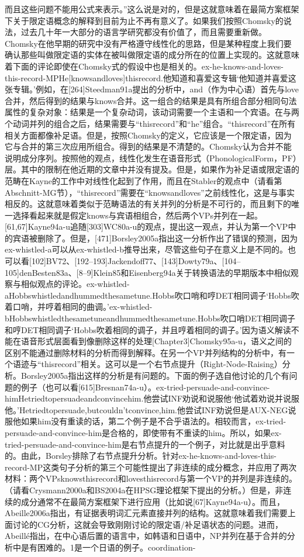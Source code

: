 而且这些问题不能用公式来表示。”这么说是对的，但是这就意味着在最简方案框架下关于限定语概念的解释到目前为止不再有意义了。如果我们按照Chomsky的说法，过去几十年一大部分的语言学研究都没有价值了，而且需要重新做。Chomsky在他早期的研究中没有严格遵守线性化的思路，但是某种程度上我们要确认那些叫做限定语的实体在被叫做限定语的成分所在的位置上实现的。这就意味着下面的评论即使在Chomsky式的假设中也是相关的。ex-he-knows-and-loves-this-record-MPHe[knowsandloves]thisrecord.他知道和喜爱这专辑`他知道并喜爱这张专辑。'例如，在[264]Steedman91a提出的分析中，and（作为中心语）首先与love合并，然后得到的结果与knows合并。这一组合的结果是具有所组合部分相同句法属性的复杂对象：结果是一个复杂动词，该动词需要一个主语和一个宾语。在与两个动词并列的组合之后，结果需要与“thisrecord”和“he”组合。“thisrecord”在所有相关方面都像补足语。但是，按照Chomsky的定义，它应该是一个限定语，因为它与合并的第三次应用所组合。得到的结果是不清楚的。Chomsky认为合并不能说明成分序列。按照他的观点，线性化发生在语音形式（PhonologicalForm，PF）层。其中的限制在他近期的文章中并没有提及。但是，如果作为补足语或限定语的范畴在Kayne的工作中对线性化起到了作用，而且在Stabler的观点中（请看第Abschnitt-MG节），“thisrecord”需要在“knowsandloves”之前线性化，这是与事实相反的。这就意味着类似于范畴语法的有关并列的分析是不可行的，而且剩下的唯一选择看起来就是假定knows与宾语相组合，然后两个VPs并列在一起。[61,67]Kayne94a-u追随[303]WC80a-u的观点，提出这一观点，并认为第一个VP中的宾语被删除了。但是，[471]Borsley2005a指出这一分析作出了错误的预测，因为ex-whistled-a可以从ex-whistled-b推导出来，尽管这些句子在意义上是不同的。也可以看[102]BV72、[192--193]Jackendoff77、[143]Dowty79a、[104--105]denBesten83a、[8--9]Klein85和Eisenberg94a关于转换语法的早期版本中相似观察与相似观点的评论。ex-whistled-aHobbswhistledandhummedthesametune.Hobbs吹口哨和哼DET相同调子`Hobbs吹着口哨，并哼着相同的曲调。'ex-whistled-bHobbswhistledthesametuneandhummedthesametune.Hobbs吹口哨DET相同调子和哼DET相同调子`Hobbs吹着相同的调子，并且哼着相同的调子。'因为语义解读不能在语音形式层面看到像删除这样的处理[Chapter3]Chomsky95a-u，语义之间的区别不能通过删除材料的分析而得到解释。在另一个VP并列结构的分析中，有一个语迹与“thisrecord”相关。这可以是一个右节点提升（Right-Node-Raising）分析。Borsley2005a指出这样的分析是有问题的。下面的例子选自他讨论的几个有问题的例子（也可以看[615]Bresnan74a-u）。ex-tried-persuade-and-convince-himHetriedtopersuadeandconvincehim.他尝试INF劝说和说服他`他试着劝说并说服他。'Hetriedtopersuade,butcouldn'tconvince,him.他尝试INF劝说但是AUX-NEG说服他如果him没有重读的话，第二个例子是不合乎语法的。相较而言，ex-tried-persuade-and-convince-him是合格的，即使带有不重读的him。所以，如果ex-tried-persuade-and-convince-him是右节点提升的一个例子，对比就是出乎意料的。由此，Borsley排除了右节点提升分析。针对ex-he-knows-and-loves-this-record-MP这类句子分析的第三个可能性提出了非连续的成分概念，并应用了两次材料：两个VPsknowsthisrecord和lovesthisrecord与第一个VP的并列是非连续的。（请看Crysmann2000a和BS2004a在HPSG理论框架下提出的分析。）但是，非连续的成分通常不在最简方案框架下进行应用（比如说[67]Kayne94a-u）。而且，Abeille2006a指出，有证据表明词汇元素直接并列的结构。这就意味着我们需要上面讨论的CG分析，这就会导致刚刚讨论的限定语/补足语状态的问题。进而，Abeillé指出，在中心语后置的语言中，如韩语和日语中，NP并列在基于合并的分析中是有困难的。1是一个日语的例子。coordination-